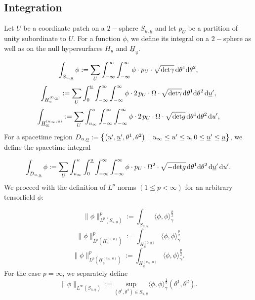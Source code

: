 \documentclass{amsart}
\newcommand{\Hbar}{\underline{H}}
\newcommand{\hsp}{\hspace{.5mm}}
\newcommand{\dubarprime}{\hspace{.5mm} \text{d} \ubar^{\prime}}
\newcommand{\ubar}{\underline{u}}
\newcommand{\LpSu}[1]{\lVert #1 \rVert_{L^p(\Suu)}}
\newcommand{\LinftySu}[1]{\lVert #1 \rVert_{L^{\infty}(\Suu)}}
\newcommand{\LpHu}[1]{\lVert #1 \rVert_{L^p(\Hu)}}
\newcommand{\LpHbaru}[1]{\lVert #1 \rVert_{L^p(\Hbu)}}
\newcommand{\duprime}{\hspace{.5mm} \text{d}u^{\prime}}
\newcommand{\Suu}{S_{u,\ubar}}
\def\Hu{H_u^{(0,\underline{u})}}
\def\Hbu{\underline{H}_{\underline{u}}^{(u_{\infty},u)}}
\begin{document}
\subsection{Integration}
Let $U$ be a coordinate patch on a $2-$sphere $S_{u,\ubar}$ and let $p_U$ be a partition of unity subordinate to $U$. For a function $\phi$, we define its integral on a $2-$sphere as well as on the null hypersurfaces $H_u$ and $\Hbar_{\ubar}$. 

\begin{equation}
    \int_{S_{u,\ubar}} \phi := \sum_{U} \int_{-\infty}^{\infty}\int_{-\infty}^{\infty} \phi \cdot p_U \cdot \sqrt{\text{det}\gamma}\hsp \text{d}\theta^1 \text{d}\theta^2,
\end{equation}
\begin{equation}
    \int_{\Hu} := \sum_{U} \int_{0}^{\ubar} \int_{-\infty}^{\infty}\int_{-\infty}^{\infty} \phi \cdot2 \hsp p_U \cdot \Omega \cdot \sqrt{\text{det}\gamma}\hsp \text{d}\theta^1 \text{d}\theta^2 \dubarprime,
\end{equation}
\begin{equation}
    \int_{\underline{H}_{\ubar}^{(u_{\infty},u)}} := \sum_{U} \int_{u_{\infty}}^{u} \int_{-\infty}^{\infty}\int_{-\infty}^{\infty} \phi \cdot2 \hsp p_U \cdot \Omega \cdot \sqrt{\text{det}g}\hsp \text{d}\theta^1 \text{d}\theta^2 \duprime,
\end{equation}For a spacetime region $D_{u,\ubar} : =  \begin{Bmatrix} \left( u^{\prime}, \ubar^{\prime}, \theta^1, \theta^2 \right) \hsp \mid \hsp u_{\infty} \leq u^{\prime} \leq u, 0\leq \ubar^{\prime} \leq \ubar \end{Bmatrix}$, we define the spacetime integral

\begin{equation}
      \int_{D_{u,\ubar}} \phi := \sum_{U} \int_{u_{\infty}}^{u} \int_{0}^{\ubar}  \int_{-\infty}^{\infty}\int_{-\infty}^{\infty} \phi \cdot  p_U \cdot \Omega^2 \cdot \sqrt{-\text{det}g}\hsp \text{d}\theta^1 \text{d}\theta^2 \dubarprime\duprime.
\end{equation}We proceed with the definition of $L^p$ norms $(1\leq p < \infty)$ for an arbitrary tensorfield $\phi$:

\begin{equation}
 \LpSu{\phi}^p :=   \int_{\Suu} \langle \phi, \phi \rangle_{\gamma}^{\frac{p}{2}}
\end{equation}
\begin{equation}
    \LpHu{\phi}^p := \int_{\Hu}\langle \phi, \phi \rangle_{\gamma}^{\frac{p}{2}}
\end{equation}
\begin{equation}
    \LpHbaru{\phi}^p := \int_{\Hbu}\langle \phi, \phi \rangle_{\gamma}^{\frac{p}{2}}.
\end{equation}For the case $p=\infty$, we separately define 
\begin{equation}
    \LinftySu{\phi} := \underset{(\theta^1, \theta^2) \in \Suu}{\text{sup}}\langle \phi, \phi \rangle_{\gamma}^{\frac{1}{2}}(\theta^1,\theta^2).
\end{equation}
\end{document}
